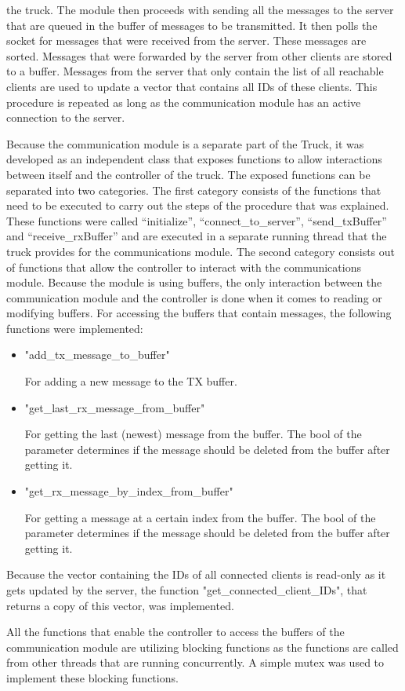 the truck. The module then proceeds with sending all the messages to the server that are queued in the
buffer of messages to be transmitted. It then polls the socket for messages that were received from the
server. These messages are sorted. Messages that were forwarded by the server from other clients are
stored to a buffer. Messages from the server that only contain the list of all reachable clients are
used to update a vector that contains all IDs of these clients. This procedure is repeated as long as
the communication module has an active connection to the server.
\par
\medskip
Because the communication module is a separate part of the Truck, it was developed as an independent
class that exposes functions to allow interactions between itself and the controller of the truck. The
exposed functions can be separated into two categories. The first category consists of the functions
that need to be executed to carry out the steps of the procedure that was explained. These functions
were called “initialize”, “connect\_to\_server”, “send\_txBuffer” and “receive\_rxBuffer” and are
executed in a separate running thread that the truck provides for the communications module. The second
category consists out of functions that allow the controller to interact with the communications module.
Because the module is using buffers, the only interaction between the communication module and the
controller is done when it comes to reading or modifying buffers. For accessing the buffers that contain
messages, the following functions were implemented:
\begin{itemize}
    \item "add\_tx\_message\_to\_buffer"
    \par For adding a new message to the TX buffer.
    \item "get\_last\_rx\_message\_from\_buffer"
    \par For getting the last (newest) message from the buffer. The bool of the parameter determines
    if the message should be deleted from the buffer after getting it.
    \item "get\_rx\_message\_by\_index\_from\_buffer"
    \par For getting a message at a certain index from the buffer. The bool of the parameter determines if the message should be deleted from the buffer after getting it.
\end{itemize}
Because the vector containing the IDs of all connected clients is read-only as it gets updated by the
server, the function "get\_connected\_client\_IDs", that returns a copy of this vector,
was implemented.
\par
All the functions that enable the controller to access the buffers of the communication module are utilizing blocking functions as the functions are
called from other threads that are running concurrently. A simple mutex was used to implement these blocking functions.

